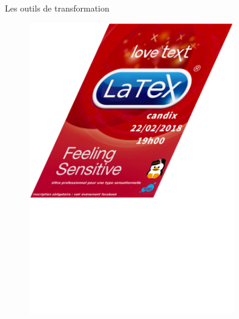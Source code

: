 \begin{frame}{Les outils de transformation}
\begin{overprint}
\begin{enumerate}
{\begin{minipage}{0.45\textwidth}
\begin{figure}
				    	\includegraphics[width=0.8\textwidth]{Images/Shear.png}
				\end{figure}
				\end{minipage}
		}

\end{enumerate}
\end{overprint}
\end{frame}
